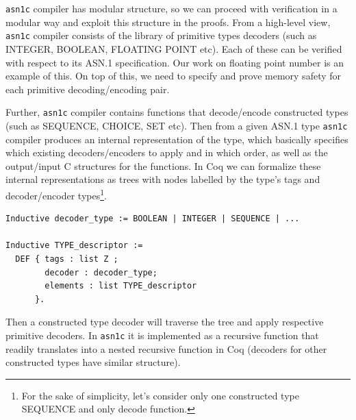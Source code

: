 \documentclass[acmsmall,nonacm]{acmart}
\begin{document}
\texttt{asn1c} compiler has modular structure, so we can proceed with
verification in a modular way and exploit this structure in the
proofs. From a high-level view, \texttt{asn1c} compiler consists of
the library of primitive types decoders (such as INTEGER, BOOLEAN,
FLOATING POINT etc). Each of these can be verified with respect to its
ASN.1 specification. Our work on floating point number is an example
of this. On top of this, we need to specify and prove memory safety
for each primitive decoding/encoding pair.

Further, \texttt{asn1c} compiler contains functions that decode/encode
constructed types (such as SEQUENCE, CHOICE, SET etc). Then from a
given ASN.1 type \texttt{asn1c} compiler produces an internal
representation of the type, which basically specifies which existing
decoders/encoders to apply and in which order, as well as the
output/input C structures for the functions. In Coq we can formalize
these internal representations as trees with nodes labelled by the
type's tags and decoder/encoder types\footnote{For the sake of
  simplicity, let's consider only one constructed type SEQUENCE and
  only decode function.}.



 \begin{lstlisting}[language=Coq]
Inductive decoder_type := BOOLEAN | INTEGER | SEQUENCE | ...

Inductive TYPE_descriptor :=
  DEF { tags : list Z ;
        decoder : decoder_type;
        elements : list TYPE_descriptor 
      }.
 \end{lstlisting}

 Then a constructed type decoder will traverse the tree and apply
 respective primitive decoders. In \texttt{asn1c} it is implemented as
 a recursive function that readily translates into a nested recursive
 function in Coq (decoders for other constructed types have similar
 structure).
\end{document}
